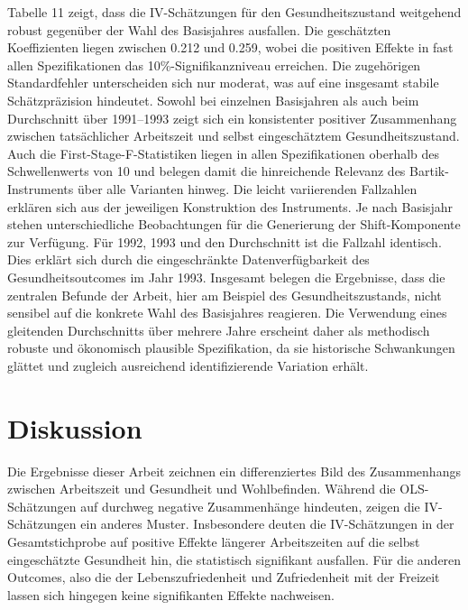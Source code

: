 \documentclass[12pt,a4paper]{article}
\begin{document}
Tabelle 11 zeigt, dass die IV-Schätzungen für den Gesundheitszustand weitgehend robust gegenüber der Wahl des Basisjahres ausfallen. Die geschätzten Koeffizienten liegen zwischen 0{.}212 und 0{.}259, wobei die positiven Effekte in fast allen Spezifikationen das 10\%-Signifikanzniveau erreichen. Die zugehörigen Standardfehler unterscheiden sich nur moderat, was auf eine insgesamt stabile Schätzpräzision hindeutet. Sowohl bei einzelnen Basisjahren als auch beim Durchschnitt über 1991–1993 zeigt sich ein konsistenter positiver Zusammenhang zwischen tatsächlicher Arbeitszeit und selbst eingeschätztem Gesundheitszustand. Auch die First-Stage-F-Statistiken liegen in allen Spezifikationen oberhalb des Schwellenwerts von 10 und belegen damit die hinreichende Relevanz des Bartik-Instruments über alle Varianten hinweg. Die leicht variierenden Fallzahlen erklären sich aus der jeweiligen Konstruktion des Instruments. Je nach Basisjahr stehen unterschiedliche Beobachtungen für die Generierung der Shift-Komponente zur Verfügung. Für 1992, 1993 und den Durchschnitt ist die Fallzahl identisch. Dies erklärt sich durch die eingeschränkte Datenverfügbarkeit des Gesundheitsoutcomes im Jahr 1993. Insgesamt belegen die Ergebnisse, dass die zentralen Befunde der Arbeit, hier am Beispiel des Gesundheitszustands, nicht sensibel auf die konkrete Wahl des Basisjahres reagieren. Die Verwendung eines gleitenden Durchschnitts über mehrere Jahre erscheint daher als methodisch robuste und ökonomisch plausible Spezifikation, da sie historische Schwankungen glättet und zugleich ausreichend identifizierende Variation erhält.



\section{Diskussion}
Die Ergebnisse dieser Arbeit zeichnen ein differenziertes Bild des Zusammenhangs zwischen Arbeitszeit und Gesundheit und Wohlbefinden. Während die OLS-Schätzungen auf durchweg negative Zusammenhänge hindeuten, zeigen die IV-Schätzungen ein anderes Muster. Insbesondere deuten die IV-Schätzungen in der Gesamtstichprobe auf positive Effekte längerer Arbeitszeiten auf die selbst eingeschätzte Gesundheit hin, die statistisch signifikant ausfallen. Für die anderen Outcomes, also die der Lebenszufriedenheit und Zufriedenheit mit der Freizeit lassen sich hingegen keine signifikanten Effekte nachweisen.
\end{document}
